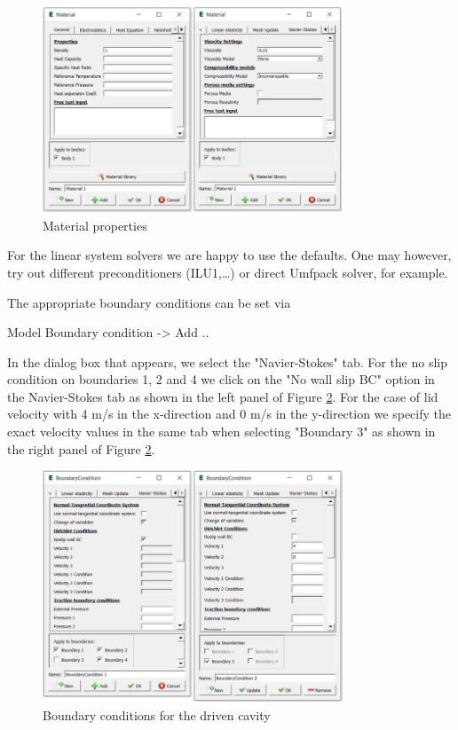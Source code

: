 \begin{figure}[H]
\centering
\includegraphics[width=0.8\textwidth]{DC_material}
\caption{Material properties}\label{fg:DC_material}
\end{figure}

For the linear system solvers we are happy to use the defaults. One may however, try out different preconditioners (ILU1,\ldots) or direct Umfpack solver, for example.

The appropriate boundary conditions can be set via  

\ttbegin
Model
  Boundary condition -> Add ..
\ttend

In the dialog box that appears, we select the "Navier-Stokes" tab. 
For the no slip condition on boundaries 1, 2 and 4 we click on the "No wall slip BC" option in the Navier-Stokes tab as shown in the left panel of Figure \ref{fg:DC_boundary}. 
For the case of lid velocity with 4 m/s in the x-direction and 0 m/s in the y-direction we specify the exact velocity values in the same tab when selecting "Boundary 3" as shown in the right panel of Figure \ref{fg:DC_boundary}.

\begin{figure}[H]
\centering
\includegraphics[width=0.8\textwidth]{DC_boundary}
\caption{Boundary conditions for the driven cavity}\label{fg:DC_boundary}
\end{figure}


